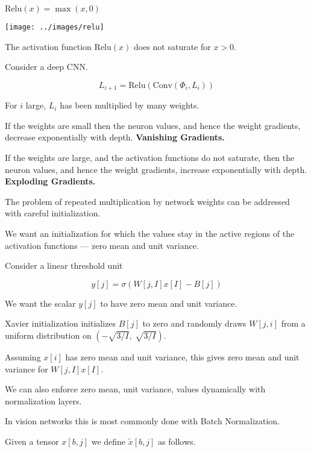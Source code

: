 {$\mathrm{Relu}(x) = \max(x,0)$

\vfill
\centerline{\texttt{[image: ../images/relu]}}

\vfill
The activation function $\mathrm{Relu}(x)$ does not saturate for $x > 0$.


Consider a deep CNN.

$$L_{i+1} = \mathrm{Relu}(\mathrm{Conv}(\Phi_i,L_i))$$

\vfill
For $i$ large, $L_i$ has been multiplied by many weights.

\vfill
If the weights are small then the neuron values, and hence the weight gradients, decrease exponentially with depth. {\bf Vanishing Gradients.}

\vfill
If the weights are large, and the activation functions do not saturate, then the neuron values, and hence the weight gradients,
increase exponentially with depth. {\bf Exploding Gradients.}


The problem of repeated multiplication by network weights can be addressed with careful initialization.

\vfill
We want an initialization for which the values stay in the active regions of the activation functions --- zero mean and unit variance.



Consider a linear threshold unit

\vfill
$$y[j] = \sigma(W[j,I]x[I] - B[j])$$

\vfill
We want the scalar $y[j]$ to have zero mean and unit variance.

\vfill
Xavier initialization initializes $B[j]$ to zero and randomly draws $W[j,i]$ from a uniform distribution on $\left(-\sqrt{3/I},\;\sqrt{3/I}\right)$.

\vfill
Assuming $x[i]$ has zero mean and unit variance, this gives zero mean and unit variance for $W[j,I]x[I]$.


We can also enforce zero mean, unit variance, values dynamically with normalization layers.

\vfill
In vision networks this is most commonly done with Batch Normalization.

Given a tensor $x[b,j]$ we define $\tilde{x}[b,j]$ as follows.

}
